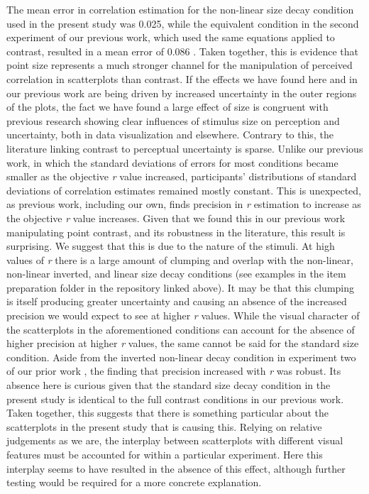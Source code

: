 \documentclass{vgtc}                          %
\begin{document}
The mean error in correlation estimation for the non-linear size decay condition used
in the present study was 0.025, while the equivalent condition in the second experiment
of our previous work, which used the same equations applied to contrast, resulted
in a mean error of 0.086 \cite{strain_2023}. Taken together, this is evidence that point size represents a much stronger channel for the manipulation of perceived correlation in scatterplots than contrast. If the effects
we have found here and in our previous work
are being driven by increased uncertainty in the outer regions of the plots,
the fact we have found a large effect of size is congruent with previous research
\cite{hong_2021, grice_1983, alais_2004} showing clear influences of stimulus
size on perception and uncertainty, both in data visualization and elsewhere. Contrary to this,
the literature linking contrast to perceptual
uncertainty is sparse. Unlike our previous work, in which the standard deviations of errors
for most conditions became smaller as the objective \emph{r} value increased, participants'
distributions of standard deviations of correlation estimates remained mostly constant. This
is unexpected, as previous work, including our own, finds precision
in \emph{r} estimation to increase as the objective \emph{r} value increases. Given that we found
this in our previous work \cite{strain_2023} manipulating point contrast, and
its robustness in the literature, this result is surprising. We suggest that this
is due to the nature of the stimuli. At high values of \emph{r} there is a large amount
of clumping and overlap with the non-linear, non-linear inverted, and linear size decay conditions (see examples in the item preparation folder in the repository linked above). It may be that this
clumping is itself producing greater uncertainty and causing an absence of the increased
precision we would expect to see at higher \emph{r} values. While the visual character
of the scatterplots in the aforementioned conditions can account for the absence
of higher precision at higher \emph{r} values, the same cannot be said for the standard size
condition. Aside from the inverted non-linear decay condition in experiment two of
our prior work \cite{strain_2023}, the finding that precision increased with \emph{r}
was robust. Its absence here is curious given that the standard size decay condition in
the present study is identical to the full contrast conditions in our previous work.
Taken together, this suggests that there is something particular about the scatterplots
in the present study that is causing this. Relying on relative judgements as we are,
the interplay between scatterplots with different visual features must be accounted for within a particular experiment.
Here this interplay seems to have resulted in the absence of this effect, although
further testing would be required for a more concrete explanation.
\end{document}
